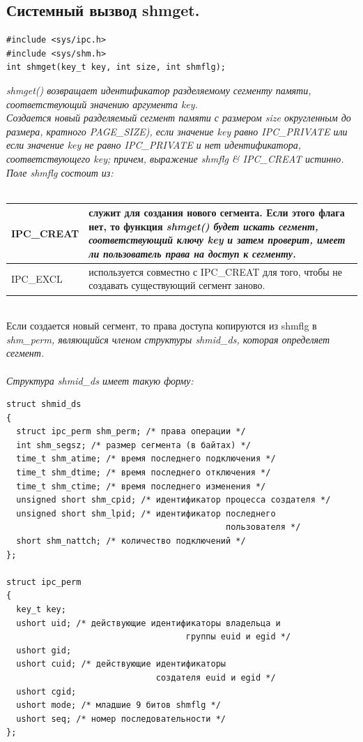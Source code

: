 \documentclass[a4paper]{article}
\begin{document}
\subsection{\Large Системный вызвод shmget.}
\begin{verbatim}
#include <sys/ipc.h>
#include <sys/shm.h>
int shmget(key_t key, int size, int shmflg);
\end{verbatim}
\sl shmget() \rm возвращает идентификатор разделяемому сегменту памяти, соответствующий значению аргумента \sl key.\\
\rm Создается новый разделяемый сегмент памяти с размером \sl size \rm округленным до размера, кратного PAGE\_SIZE), если значение key равно IPC\_PRIVATE или если значение \sl key \rm не равно IPC\_PRIVATE и нет идентификатора, соответствующего key; причем, выражение shmflg \& IPC\_CREAT истинно.\\
Поле \sl shmflg \rm состоит из:\\\\
\begin{tabular}{|p{3cm}|p{12cm}|}
  \hline
  IPC\_CREAT & служит для создания нового сегмента. Если этого флага нет, то функция \sl shmget() \rm будет искать сегмент, соответствующий ключу \sl key \rm и затем проверит, имеет ли пользователь права на доступ к сегменту. \\
  \hline
  IPC\_EXCL & используется совместно с IPC\_CREAT для того, чтобы не создавать существующий сегмент заново.\\
  \hline
\end{tabular}\\
Если создается новый сегмент, то права доступа копируются из shmflg в \sl shm\_perm, \rm являющийся членом структуры \sl shmid\_ds, \rm которая определяет сегмент. \\\\
Структура \sl shmid\_ds \rm имеет такую форму:
\begin{verbatim}
struct shmid_ds 
{
  struct ipc_perm shm_perm; /* права операции */
  int shm_segsz; /* размер сегмента (в байтах) */
  time_t shm_atime; /* время последнего подключения */
  time_t shm_dtime; /* время последнего отключения */
  time_t shm_ctime; /* время последнего изменения */
  unsigned short shm_cpid; /* идентификатор процесса создателя */
  unsigned short shm_lpid; /* идентификатор последнего 
                                            пользователя */
  short shm_nattch; /* количество подключений */
};

struct ipc_perm 
{
  key_t key;
  ushort uid; /* действующие идентификаторы владельца и 
                                    группы euid и egid */
  ushort gid;
  ushort cuid; /* действующие идентификаторы 
                              создателя euid и egid */
  ushort cgid;
  ushort mode; /* младшие 9 битов shmflg */
  ushort seq; /* номер последовательности */
};
\end{verbatim}
\end{document}
